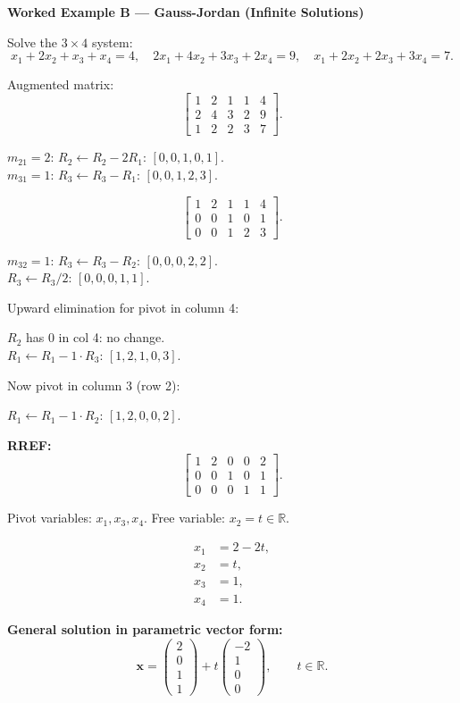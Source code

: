 \documentclass[12pt,a4paper]{article}
\begin{document}
\textbf{Worked Example B --- Gauss-Jordan (Infinite Solutions)}

Solve the $3 \times 4$ system:
\[
x_1 + 2x_2 + x_3 + x_4 = 4, \quad
2x_1 + 4x_2 + 3x_3 + 2x_4 = 9, \quad
x_1 + 2x_2 + 2x_3 + 3x_4 = 7.
\]

Augmented matrix:
\[
\left[\begin{array}{cccc|c}
1 & 2 & 1 & 1 & 4 \\
2 & 4 & 3 & 2 & 9 \\
1 & 2 & 2 & 3 & 7
\end{array}\right].
\]

$m_{21}=2$: $R_2 \leftarrow R_2 - 2R_1$: $[0,0,1,0,1]$.\\
$m_{31}=1$: $R_3 \leftarrow R_3 - R_1$: $[0,0,1,2,3]$.

\[
\left[\begin{array}{cccc|c}
1 & 2 & 1 & 1 & 4 \\
0 & 0 & 1 & 0 & 1 \\
0 & 0 & 1 & 2 & 3
\end{array}\right].
\]

$m_{32}=1$: $R_3 \leftarrow R_3 - R_2$: $[0,0,0,2,2]$.\\
$R_3 \leftarrow R_3/2$: $[0,0,0,1,1]$.

Upward elimination for pivot in column 4:

$R_2$ has $0$ in col 4: no change.\\
$R_1 \leftarrow R_1 - 1\cdot R_3$: $[1,2,1,0,3]$.

Now pivot in column 3 (row 2):

$R_1 \leftarrow R_1 - 1\cdot R_2$: $[1,2,0,0,2]$.

\textbf{RREF:}
\[
\left[\begin{array}{cccc|c}
1 & 2 & 0 & 0 & 2 \\
0 & 0 & 1 & 0 & 1 \\
0 & 0 & 0 & 1 & 1
\end{array}\right].
\]

Pivot variables: $x_1, x_3, x_4$. Free variable: $x_2 = t \in \mathbb{R}$.

\begin{align*}
x_1 &= 2 - 2t, \\
x_2 &= t, \\
x_3 &= 1, \\
x_4 &= 1.
\end{align*}

\textbf{General solution in parametric vector form:}
\[
\mathbf{x} =
\begin{pmatrix} 2 \\ 0 \\ 1 \\ 1 \end{pmatrix}
+ t
\begin{pmatrix} -2 \\ 1 \\ 0 \\ 0 \end{pmatrix},
\qquad t \in \mathbb{R}.
\]
\end{document}
